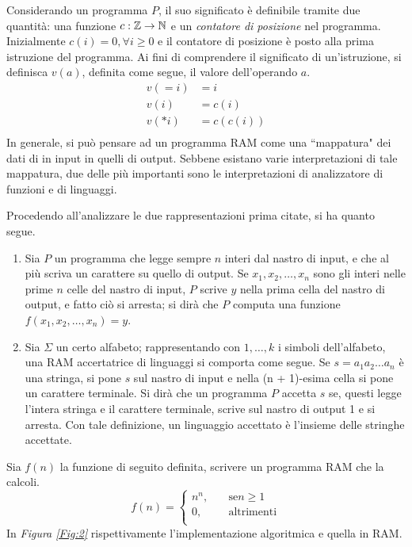 \documentclass{subfiles}
\begin{document}
\noindent Considerando un programma \(P\), il suo significato è definibile tramite due quantità: una funzione \(c : \mathbb{Z} \to \mathbb{N}\) e un \emph{contatore di posizione} nel programma. \\
Inizialmente \(c(i) = 0, \forall i \ge 0\) e il contatore di posizione è posto alla prima istruzione del programma.
Ai fini di comprendere il significato di un'istruzione, si definisca \(v(a)\), definita come segue, il valore dell'operando \(a\).
\[\begin{aligned}
        v(=i) & = i       \\
        v(i)  & = c(i)    \\
        v(*i) & = c(c(i)) \\
    \end{aligned}\]
\noindent In generale, si può pensare ad un programma RAM come una ``mappatura" dei dati di in input in quelli di output.
Sebbene esistano varie interpretazioni di tale mappatura, due delle più importanti sono le interpretazioni di analizzatore di funzioni e di linguaggi.
\clearpage

\noindent Procedendo all'analizzare le due rappresentazioni prima citate, si ha quanto segue.
\begin{enumerate}
    \item Sia \(P\) un programma che legge sempre \(n\) interi dal nastro di input, e che al più scriva un carattere su quello di output.
          Se \(x_{1}, x_{2}, \ldots, x_{n}\) sono gli interi nelle prime \(n\) celle del nastro di input, \(P\) scrive \(y\) nella prima cella del nastro di output, e fatto ciò si arresta;
          si dirà che \(P\) computa una funzione \(f(x_{1}, x_{2}, \ldots, x_{n}) = y\).

    \item Sia \(\Sigma\) un certo alfabeto; rappresentando con \(1, \ldots, k\) i simboli dell'alfabeto, una RAM accertatrice di linguaggi si comporta come segue.
          Se \(s = a_{1} a_{2} \ldots a_{n}\) è una stringa, si pone \(s\) sul nastro di input e nella (n + 1)-esima cella si pone un carattere terminale.
          Si dirà che un programma \(P\) accetta \(s\) se, questi legge l'intera stringa e il carattere terminale, scrive sul nastro di output 1 e si arresta.
          Con tale definizione, un linguaggio accettato è l'insieme delle stringhe accettate.
\end{enumerate}

\begin{Example*}
    Sia \(f(n)\) la funzione di seguito definita, scrivere un programma RAM che la calcoli.
    \[f(n) = \begin{cases}
            n^{n}, \quad & \text{se} n \ge 1 \\
            0, \quad     & \text{altrimenti} \\
        \end{cases}\]
    \noindent In \emph{Figura \ref{Fig:2}} rispettivamente l'implementazione algoritmica e quella in RAM.
    

\end{Example*}
\end{document}
